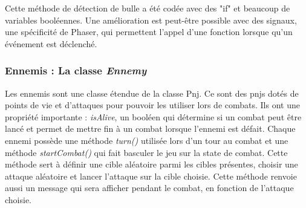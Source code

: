 \documentclass[11pt]{article}
\begin{document}
\begin{appendices}
Cette méthode de détection de bulle a été codée avec des "if" et beaucoup de variables booléennes. Une amélioration est peut-être possible avec des signaux, une spécificité de Phaser, qui permettent l'appel d'une fonction lorsque qu'un événement est déclenché.\subsubsection{Ennemis : La classe \textit{Ennemy}}
Les ennemis sont une classe étendue de la classe Pnj. Ce sont des pnjs dotés de points de vie et d'attaques pour pouvoir les utiliser lors de combats. Ils ont une propriété importante : \textit{isAlive}, un booléen qui détermine si un combat peut être lancé et permet de mettre fin à un combat lorsque l'ennemi est défait. Chaque ennemi possède une méthode \textit{turn()} utilisée lors d'un tour au combat et une méthode \textit{startCombat()} qui fait basculer le jeu sur la state de combat. Cette méthode sert à définir une cible aléatoire parmi les cibles présentes, choisir une attaque aléatoire et lancer l'attaque sur la cible choisie. Cette méthode renvoie aussi un message qui sera afficher pendant le combat, en fonction de l'attaque choisie.

\end{appendices}
\end{document}
